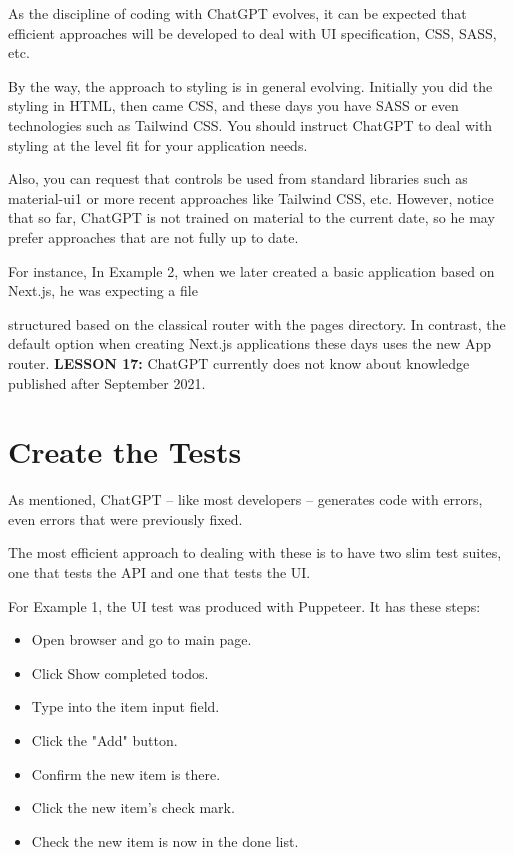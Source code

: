 \documentclass[runningheads]{llncs}
\begin{document}
As the discipline of coding with ChatGPT evolves, it can be expected that efficient approaches will be developed to deal with UI specification, CSS, SASS, etc.

By the way, the approach to styling is in general evolving. Initially you did the styling in HTML, then came CSS, and these days you have SASS or even technologies such as Tailwind CSS. You should instruct ChatGPT to deal with styling at the level fit for your application needs.

Also, you can request that controls be used from standard libraries such as material-ui1 or more recent approaches like Tailwind CSS, etc. However, notice that so far, ChatGPT is not trained on material to the current date, so he may prefer approaches that are not fully up to date.

For instance, In Example 2, when we later created a basic application based on Next.js, he was expecting a file
 
structured based on the classical router with the pages directory. In contrast, the default option when creating Next.js applications these days uses the new App router.
\textbf{LESSON 17:} ChatGPT currently does not know about knowledge published after September 2021.

\section{Create the Tests}
As mentioned, ChatGPT – like most developers – generates code with errors, even errors that were previously fixed.

The most efficient approach to dealing with these is to have two slim test suites, one that tests the API and one that tests the UI.

For Example 1, the UI test was produced with Puppeteer. It has these steps:
\begin{itemize}
    \item Open browser and go to main page.
    \item Click Show completed todos.
    \item Type into the item input field.
    \item Click the "Add" button.
    \item Confirm the new item is there.
    \item Click the new item's check mark.
    \item Check the new item is now in the done list.
\end{itemize}
\end{document}
